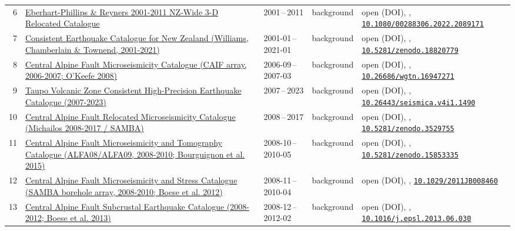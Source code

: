 \documentclass[10pt,a4paper]{article}
\begin{document}
\begin{small}
\begin{longtable}{@{}r L{4.5cm} L{1.9cm} L{1.6cm} L{5.7cm}@{}}
6 & \hyperlink{c:6}{Eberhart-Phillips \& Reyners 2001-2011 NZ-Wide 3-D Relocated Catalogue} & 2001\,--\,2011 & background & open (DOI), \cite{EberhartPhillips2022}, {\footnotesize \href{https://doi.org/10.1080/00288306.2022.2089171}{\nolinkurl{10.1080/00288306.2022.2089171}}} \\
7 & \hyperlink{c:7}{Consistent Earthquake Catalogue for New Zealand (Williams, Chamberlain \& Townend, 2001-2021)} & 2001-01\,--\,2021-01 & background & open (DOI), \cite{Williams2026}, {\footnotesize \href{https://doi.org/10.5281/zenodo.18820779}{\nolinkurl{10.5281/zenodo.18820779}}} \\
8 & \hyperlink{c:8}{Central Alpine Fault Microseismicity Catalogue (CAIF array, 2006-2007; O'Keefe 2008)} & 2006-09\,--\,2007-03 & background & open (DOI), \cite{OKeefe2008}, {\footnotesize \href{https://doi.org/10.26686/wgtn.16947271}{\nolinkurl{10.26686/wgtn.16947271}}} \\
9 & \hyperlink{c:9}{Taupo Volcanic Zone Consistent High-Precision Earthquake Catalogue (2007-2023)} & 2007\,--\,2023 & background & open (DOI), \cite{IllsleyKemp2025}, {\footnotesize \href{https://doi.org/10.26443/seismica.v4i1.1490}{\nolinkurl{10.26443/seismica.v4i1.1490}}} \\
10 & \hyperlink{c:10}{Central Alpine Fault Relocated Microseismicity Catalogue (Michailos 2008-2017 / SAMBA)} & 2008\,--\,2017 & background & open (DOI), \cite{Michailos2019}, {\footnotesize \href{https://doi.org/10.5281/zenodo.3529755}{\nolinkurl{10.5281/zenodo.3529755}}} \\
11 & \hyperlink{c:11}{Central Alpine Fault Microseismicity and Tomography Catalogue (ALFA08/ALFA09, 2008-2010; Bourguignon et al. 2015)} & 2008-10\,--\,2010-05 & background & open (DOI), \cite{Bourguignon2015}, {\footnotesize \href{https://doi.org/10.5281/zenodo.15853335}{\nolinkurl{10.5281/zenodo.15853335}}} \\
12 & \hyperlink{c:12}{Central Alpine Fault Microseismicity and Stress Catalogue (SAMBA borehole array, 2008-2010; Boese et al. 2012)} & 2008-11\,--\,2010-04 & background & open (DOI), \cite{Boese2012}, {\footnotesize \href{https://doi.org/10.1029/2011JB008460}{\nolinkurl{10.1029/2011JB008460}}} \\
13 & \hyperlink{c:13}{Central Alpine Fault Subcrustal Earthquake Catalogue (2008-2012; Boese et al. 2013)} & 2008-12\,--\,2012-02 & background & open (DOI), \cite{Boese2013}, {\footnotesize \href{https://doi.org/10.1016/j.epsl.2013.06.030}{\nolinkurl{10.1016/j.epsl.2013.06.030}}} \\

\end{longtable}
\end{small}
\end{document}
